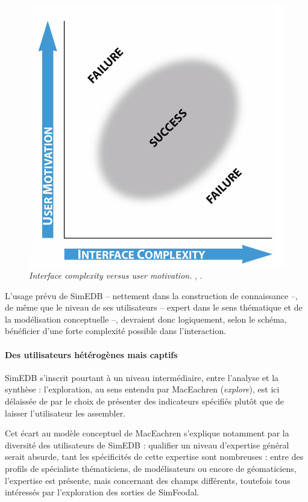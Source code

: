 \begin{figure}[H]
\begin{minipage}[t]{.46\linewidth}
					\includegraphics[width=\linewidth]{img/Roth_Interface_Complexity.png}
					\caption{\og \textit{Interface complexity versus user motivation. }\fg{}, \cite[79]{roth_interactive_2013}.}
					\label{fig:interface-complexity}
				\end{minipage}
			\end{figure}

			L'usage prévu de SimEDB -- nettement dans la construction de connaissance --, de même que le \og niveau\fg{} de ses utilisateurs -- expert dans le sens thématique et de la modélisation conceptuelle --, devraient donc logiquement, selon le schéma, bénéficier d'une forte complexité possible dans l'interaction.

			\paragraph*{Des utilisateurs hétérogènes mais captifs}

			SimEDB s'inscrit pourtant à un niveau intermédiaire, entre l'analyse et la synthèse : l'exploration, au sens entendu par MacEachren (\textit{explore}), est ici délaissée de par le choix de présenter des indicateurs spécifiés plutôt que de laisser l'utilisateur les assembler.

			Cet écart au modèle conceptuel de MacEachren s'explique notamment par la diversité des utilisateurs de SimEDB : qualifier un niveau d'expertise général serait absurde, tant les spécificités de cette expertise sont nombreuses : entre des profils de spécialiste thématiciens, de modélisateurs ou encore de géomaticiens, l'expertise est présente, mais concernant des champs différents, toutefois tous intéressés par l'exploration des sorties de SimFeodal.

